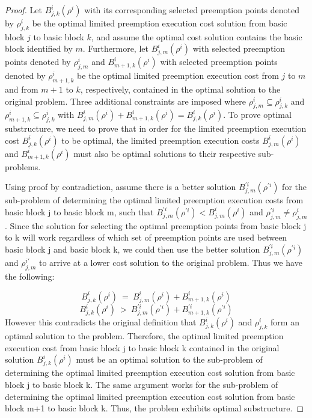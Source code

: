 \begin{proof}
Let $B_{j,k}^{i}(\rho^{i})$ with its corresponding selected preemption points denoted by $\rho_{j,k}^{i}$ be the optimal limited preemption execution cost solution from basic block $j$ to basic block $k$, and assume the optimal cost solution contains the basic block identified by $m$. Furthermore, let $B_{j,m}^{i}(\rho^{i})$ with selected preemption points denoted by $\rho_{j,m}^{i}$ and $B_{m+1,k}^{i}(\rho^{i})$ with selected preemption points denoted by $\rho_{m+1,k}^{i}$ be the optimal limited preemption execution cost from $j$ to $m$ and from $m+1$ to $k$, respectively, contained in the optimal solution to the original problem. Three additional constraints are imposed where $\rho_{j,m}^{i} \subseteq \rho_{j,k}^{i}$ and $\rho_{m+1,k}^{i} \subseteq  \rho_{j,k}^{i}$ with $B_{j,m}^{i}(\rho^{i}) + B_{m+1,k}^{i}(\rho^{i}) = B_{j,k}^{i}(\rho^{i})$. To prove optimal substructure, we need to prove that in order for the limited preemption execution cost $B_{j,k}^{i}(\rho^{i})$ to be optimal, the limited preemption execution costs $B_{j,m}^{i}(\rho^{i})$ and $B_{m+1,k}^{i}(\rho^{i})$ must also be optimal solutions to their respective sub-problems.

Using proof by contradiction, assume there is a better solution $B_{j,m}^{'i}(\rho^{'i})$ for the sub-problem of determining the optimal limited preemption execution costs from basic block j to basic block m, such that $B_{j,m}^{'i}(\rho^{'i}) < B_{j,m}^{i}(\rho^{i})$ and $\rho_{j,m}^{'i} \neq \rho_{j,m}^{i}$. Since the solution for selecting the optimal preemption points from basic block j to k will work regardless of which set of preemption points are used between basic block j and basic block k, we could then use the better solution  $B_{j,m}^{'i}(\rho^{'i})$ and $\rho_{j,m}^{i'}$ to arrive at a lower cost solution to the original problem. Thus we have the following:

\begin{equation}\label{eqn:pcost-bb-1}
B_{j,k}^{i}(\rho^{i})\ =\ B_{j,m}^{i}(\rho^{i}) + B_{m+1,k}^{i}(\rho^{i})
\end{equation}
\begin{equation}\label{eqn:pcost-bb-2}
B_{j,k}^{i}(\rho^{i})\ >\ B_{j,m}^{'i}(\rho^{'i}) + B_{m+1,k}^{'i}(\rho^{'i})
\end{equation}
\noindent
However this contradicts the original definition that $B_{j,k}^{i}(\rho^{i})$ and $\rho_{j,k}^{i}$ form an optimal solution to the problem. Therefore, the optimal limited preemption execution cost from basic block j to basic block k contained in the original solution $B_{j,k}^{i}(\rho^{i})$ must be an optimal solution to the sub-problem of determining the optimal limited preemption execution cost solution from basic block j to basic block k. The same argument works for the sub-problem of determining the optimal limited preemption execution cost solution from basic block m+1 to basic block k. Thus, the problem exhibits optimal substructure.
\end{proof}

